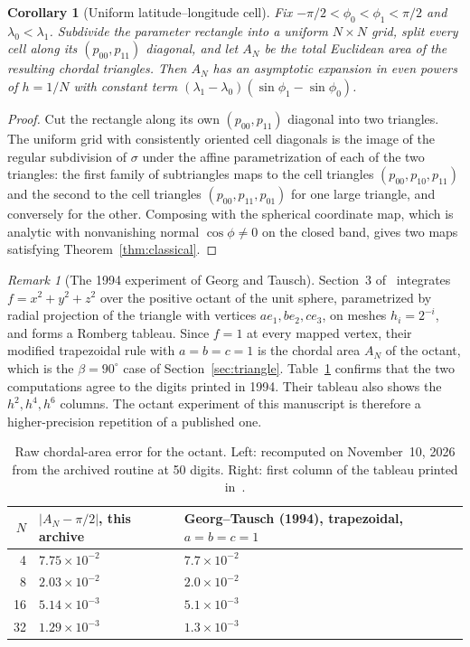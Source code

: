\documentclass[11pt]{article}
\newtheorem{corollary}{Corollary}
\theoremstyle{remark}
\newtheorem{remark}{Remark}
\begin{document}
\begin{corollary}[Uniform latitude--longitude cell]\label{cor:latlon}
Fix $-\pi/2<\phi_0<\phi_1<\pi/2$ and $\lambda_0<\lambda_1$. Subdivide the parameter rectangle
into a uniform $N\times N$ grid, split every cell along its $(p_{00},p_{11})$ diagonal, and let
$A_N$ be the total Euclidean area of the resulting chordal triangles. Then $A_N$ has an
asymptotic expansion in even powers of $h=1/N$ with constant term
$(\lambda_1-\lambda_0)(\sin\phi_1-\sin\phi_0)$.
\end{corollary}
\begin{proof}
Cut the rectangle along its own $(p_{00},p_{11})$ diagonal into two triangles. The uniform
grid with consistently oriented cell diagonals is the image of the regular subdivision of
$\sigma$ under the affine parametrization of each of the two triangles: the first family of
subtriangles maps to the cell triangles $(p_{00},p_{10},p_{11})$ and the second to the cell
triangles $(p_{00},p_{11},p_{01})$ for one large triangle, and conversely for the other.
Composing with the spherical coordinate map, which is analytic with nonvanishing normal
$\cos\phi\neq0$ on the closed band, gives two maps satisfying Theorem~\ref{thm:classical}.
\end{proof}

\begin{remark}[The 1994 experiment of Georg and Tausch]\label{rem:gt}
Section~3 of~\cite{georgtausch} integrates $f=x^2+y^2+z^2$ over the positive octant of the
unit sphere, parametrized by radial projection of the triangle with vertices
$ae_1,be_2,ce_3$, on meshes $h_i=2^{-i}$, and forms a Romberg tableau. Since $f=1$ at every
mapped vertex, their modified trapezoidal rule with $a=b=c=1$ is the chordal area $A_N$ of the
octant, which is the $\beta=90^\circ$ case of Section~\ref{sec:triangle}.
Table~\ref{tab:gt} confirms that the two computations agree to the digits printed in 1994.
Their tableau also shows the $h^2,h^4,h^6$ columns. The octant experiment of this manuscript
is therefore a higher-precision repetition of a published one.
\end{remark}

\begin{table}[ht]
\centering
\begin{tabular}{rll}
\toprule
$N$ & $|A_N-\pi/2|$, this archive & Georg--Tausch (1994), trapezoidal, $a=b=c=1$\\
\midrule
4 & $7.75\times10^{-2}$ & $7.7\times10^{-2}$\\
8 & $2.03\times10^{-2}$ & $2.0\times10^{-2}$\\
16 & $5.14\times10^{-3}$ & $5.1\times10^{-3}$\\
32 & $1.29\times10^{-3}$ & $1.3\times10^{-3}$\\
\bottomrule
\end{tabular}
\caption{Raw chordal-area error for the octant. Left: recomputed on November~10, 2026 from the
archived routine at 50 digits. Right: first column of the tableau printed
in~\cite{georgtausch}.}\label{tab:gt}
\end{table}
\end{document}
